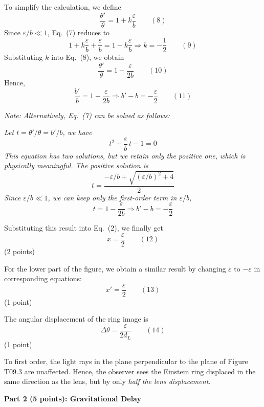 \begin{description}
  To simplify the calculation, we define
  \[ \frac{\theta'}{\theta} = 1 + k\frac{\varepsilon}{b} \qquad (8) \]
  Since $\varepsilon/b \ll 1$, Eq.\ (7) reduces to
  \[ 1 + k\frac{\varepsilon}{b} + \frac{\varepsilon}{b}
     = 1 - k\frac{\varepsilon}{b}
     \Rightarrow k = -\frac{1}{2} \qquad (9) \]
  Substituting $k$ into Eq.\ (8), we obtain
  \[ \frac{\theta'}{\theta} = 1 - \frac{\varepsilon}{2b} \qquad (10) \]
  Hence,
  \[ \frac{b'}{b} = 1 - \frac{\varepsilon}{2b}
     \Rightarrow b' - b = -\frac{\varepsilon}{2} \qquad (11) \]

  \textit{Note: Alternatively, Eq.\ (7) can be solved as follows:}

  \textit{Let $t = \theta'/\theta = b'/b$, we have}
  \[ t^2 + \frac{\varepsilon}{b}\,t - 1 = 0 \]
  \textit{This equation has two solutions, but we retain only the positive
  one, which is physically meaningful. The positive solution is}
  \[ t = \frac{-\varepsilon/b + \sqrt{(\varepsilon/b)^2 + 4}}{2} \]
  \textit{Since $\varepsilon/b \ll 1$, we can keep only the first-order term
  in $\varepsilon/b$,}
  \[ t = 1 - \frac{\varepsilon}{2b}
     \Rightarrow b' - b = -\frac{\varepsilon}{2} \]

  Substituting this result into Eq.\ (2), we finally get
  \[ x = \frac{\varepsilon}{2} \qquad (12) \]
  \hfill(2 points)

  For the lower part of the figure, we obtain a similar result by changing
  $\varepsilon$ to $-\varepsilon$ in corresponding equations:
  \[ x' = \frac{\varepsilon}{2} \qquad (13) \]
  \hfill(1 point)

  The angular displacement of the ring image is
  \[ \Delta\theta = \frac{\varepsilon}{2 d_L} \qquad (14) \]
  \hfill(1 point)

  To first order, the light rays in the plane perpendicular to the plane of
  Figure T09.3 are unaffected. Hence, the observer sees the Einstein ring
  displaced in the same direction as the lens, but by only \textit{half the
  lens displacement}.
\end{description}

\medskip\noindent\textbf{Part 2 (5 points): Gravitational Delay}

